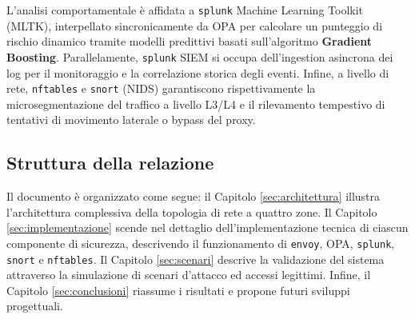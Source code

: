 L'analisi comportamentale è affidata a \texttt{splunk} Machine Learning Toolkit (MLTK), interpellato sincronicamente da OPA per calcolare un punteggio di rischio dinamico tramite modelli predittivi basati sull'algoritmo \textbf{Gradient Boosting}. Parallelamente, \texttt{splunk} SIEM si occupa dell'ingestion asincrona dei log per il monitoraggio e la correlazione storica degli eventi. Infine, a livello di rete, \texttt{nftables} e \texttt{snort} (NIDS) garantiscono rispettivamente la microsegmentazione del traffico a livello L3/L4 e il rilevamento tempestivo di tentativi di movimento laterale o bypass del proxy.

\subsection{Struttura della relazione}
Il documento è organizzato come segue: il Capitolo \ref{sec:architettura} illustra l'architettura complessiva della topologia di rete a quattro zone. Il Capitolo \ref{sec:implementazione} scende nel dettaglio dell'implementazione tecnica di ciascun componente di sicurezza, descrivendo il funzionamento di \texttt{envoy}, OPA, \texttt{splunk}, \texttt{snort} e \texttt{nftables}. Il Capitolo \ref{sec:scenari} descrive la validazione del sistema attraverso la simulazione di scenari d'attacco ed accessi legittimi. Infine, il Capitolo \ref{sec:conclusioni} riassume i risultati e propone futuri sviluppi progettuali.
